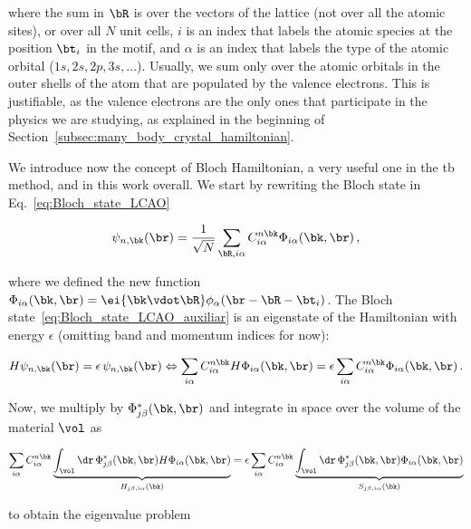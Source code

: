 \noindent where the sum in $\bR$ is over the vectors of the lattice (not over all the atomic sites), or over all $N$ unit cells, $i$ is an index that labels the atomic species at the position $\bt_i$ in the motif, and $\alpha$ is an index that labels the type of the atomic orbital ($1s,2s,2p,3s,\dots$).
Usually, we sum only over the atomic orbitals in the outer shells of the atom that are populated by the valence electrons.
This is justifiable, as the valence electrons are the only ones that participate in the physics we are studying, as explained in the beginning of Section~\ref{subsec:many_body_crystal_hamiltonian}.

We introduce now the concept of Bloch Hamiltonian, a very useful one in the \gls{tb} method, and in this work overall.
We start by rewriting the Bloch state in Eq.~\eqref{eq:Bloch_state_LCAO}

\begin{equation}
    \label{eq:Bloch_state_LCAO_auxiliar}
    \psi_{n, \bk} (\br) = \frac{1}{\sqrt{N}} \sum_{\bR,i\alpha} C_{i \alpha}^{n \bk} \Phi_{i \alpha} (\bk,\br)\,,
\end{equation}

\noindent where we defined the new function $\Phi_{i \alpha} (\bk,\br) = \ei{\bk \vdot \bR} \phi_\alpha (\br - \bR - \bt_i)$.
The Bloch state~\eqref{eq:Bloch_state_LCAO_auxiliar} is an eigenstate of the Hamiltonian with energy $\epsilon$ (omitting band and momentum indices for now):

\begin{equation}
    H \psi_{n, \bk} (\br) = \epsilon\, \psi_{n, \bk} (\br) \Leftrightarrow \sum_{i \alpha} C_{i \alpha}^{n \bk} H\Phi_{i \alpha} (\bk,\br) = \epsilon \sum_{i \alpha} C_{i \alpha}^{n \bk} \Phi_{i \alpha} (\bk,\br) \,.
\end{equation}

\noindent Now, we multiply by $\Phi^*_{j \beta} (\bk,\br)$ and integrate in space over the volume of the material $\vol$ as

\begin{equation}
    \sum_{i \alpha} C_{i \alpha}^{n \bk} \underbrace{\int_{\vol} \dr\, \Phi^*_{j \beta} (\bk,\br) H \Phi_{i \alpha} (\bk,\br)}_{H_{j \beta, i \alpha} (\bk)} = \epsilon \sum_{i \alpha} C_{i \alpha}^{n \bk} \underbrace{ \int_{\vol} \dr\, \Phi^*_{j \beta} (\bk,\br) \Phi_{i \alpha} (\bk,\br)}_{S_{j \beta, i \alpha}(\bk)}
\end{equation}

\noindent to obtain the eigenvalue problem

